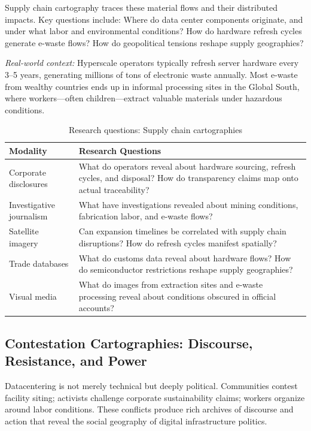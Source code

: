 \documentclass[review]{elsarticle}
\begin{document}
Supply chain cartography traces these material flows and their distributed impacts. Key questions include: Where do data center components originate, and under what labor and environmental conditions? How do hardware refresh cycles generate e-waste flows? How do geopolitical tensions reshape supply geographies?

\textit{Real-world context:} Hyperscale operators typically refresh server hardware every 3--5 years, generating millions of tons of electronic waste annually. Most e-waste from wealthy countries ends up in informal processing sites in the Global South, where workers---often children---extract valuable materials under hazardous conditions.

\begin{table}[h]
\caption{Research questions: Supply chain cartographies}
\label{tab:supply}
\begin{tabular}{p{3cm}p{9cm}}
\toprule
\textbf{Modality} & \textbf{Research Questions} \\
\midrule
Corporate disclosures & What do operators reveal about hardware sourcing, refresh cycles, and disposal? How do transparency claims map onto actual traceability? \\
\addlinespace
Investigative journalism & What have investigations revealed about mining conditions, fabrication labor, and e-waste flows? \\
\addlinespace
Satellite imagery & Can expansion timelines be correlated with supply chain disruptions? How do refresh cycles manifest spatially? \\
\addlinespace
Trade databases & What do customs data reveal about hardware flows? How do semiconductor restrictions reshape supply geographies? \\
\addlinespace
Visual media & What do images from extraction sites and e-waste processing reveal about conditions obscured in official accounts? \\
\bottomrule
\end{tabular}
\end{table}

\subsection{Contestation Cartographies: Discourse, Resistance, and Power}

Datacentering is not merely technical but deeply political. Communities contest facility siting; activists challenge corporate sustainability claims; workers organize around labor conditions. These conflicts produce rich archives of discourse and action that reveal the social geography of digital infrastructure politics.
\end{document}

